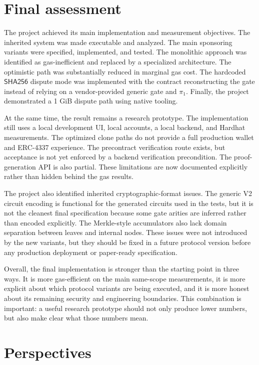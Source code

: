 \section{Final assessment}

The project achieved its main implementation and measurement objectives. The inherited
system was made executable and analyzed. The main sponsoring variants were specified,
implemented, and tested. The monolithic approach was identified as gas-inefficient and
replaced by a specialized architecture. The optimistic path was substantially reduced in
marginal gas cost. The hardcoded \(\mathsf{SHA256}\) dispute mode was implemented with the
contract reconstructing the gate instead of relying on a vendor-provided generic gate and
\(\pi_1\). Finally, the project demonstrated a 1 GiB dispute path using native tooling.

At the same time, the result remains a research prototype. The implementation still uses a
local development UI, local accounts, a local backend, and Hardhat measurements. The
optimized clone paths do not provide a full production wallet and ERC-4337 experience. The
precontract verification route exists, but acceptance is not yet enforced by a backend
verification precondition. The proof-generation API is also partial. These limitations are
now documented explicitly rather than hidden behind the gas results.

The project also identified inherited cryptographic-format issues. The generic V2 circuit
encoding is functional for the generated circuits used in the tests, but it is not the
cleanest final specification because some gate arities are inferred rather than encoded
explicitly. The Merkle-style accumulators also lack domain separation between leaves and
internal nodes. These issues were not introduced by the new variants, but they should be
fixed in a future protocol version before any production deployment or paper-ready
specification.

Overall, the final implementation is stronger than the starting point in three ways. It is
more gas-efficient on the main same-scope measurements, it is more explicit about which
protocol variants are being executed, and it is more honest about its remaining security
and engineering boundaries. This combination is important: a useful research prototype
should not only produce lower numbers, but also make clear what those numbers mean.

\section{Perspectives}

